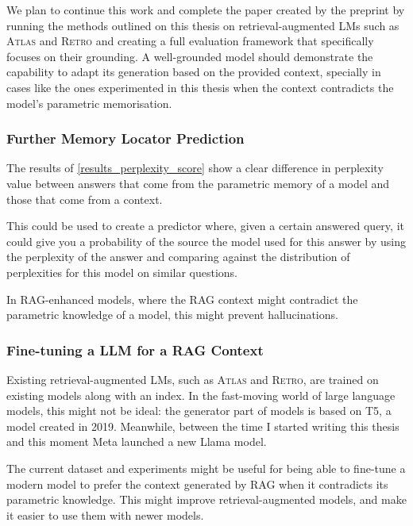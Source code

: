 We plan to continue this work and complete the paper created by the preprint by running the methods outlined on this thesis on retrieval-augmented LMs such as \textsc{Atlas} \citep{atlas_foundational} and \textsc{Retro} \citep{retro} and creating a full evaluation framework that specifically focuses on their grounding.
A well-grounded model should demonstrate the capability to adapt its generation based on the provided context, specially in cases like the ones experimented in this thesis when the context contradicts the model's parametric memorisation.

\subsubsection{Further Memory Locator Prediction}

The results of \cref{results_perplexity_score} show a clear difference in perplexity value between answers that come from the parametric memory of a model and those that come from a context.

This could be used to create a predictor where, given a certain answered query, it could give you a probability of the source the model used for this answer by using the perplexity of the answer and comparing against the distribution of perplexities for this model on similar questions.

In RAG-enhanced models, where the RAG context might contradict the parametric knowledge of a model, this might prevent hallucinations.

\subsubsection{Fine-tuning a LLM for a RAG Context}

Existing retrieval-augmented LMs, such as \textsc{Atlas} and \textsc{Retro}, are trained on existing models along with an index.
In the fast-moving world of large language models, this might not be ideal: the generator part of models is based on T5, a model created in 2019.
Meanwhile, between the time I started writing this thesis and this moment Meta launched a new Llama model.

The current dataset and experiments might be useful for being able to fine-tune a modern model to prefer the context generated by RAG when it contradicts its parametric knowledge.
This might improve retrieval-augmented models, and make it easier to use them with newer models.
